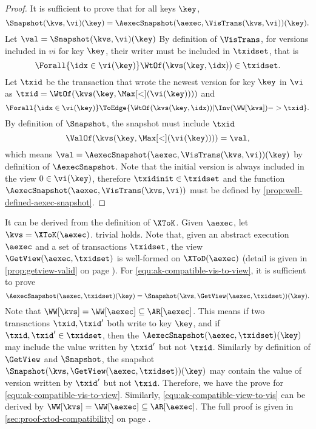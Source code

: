 \begin{proof}
    It is sufficient to prove that for all keys \( \key \),
    \[
        \Snapshot(\kvs,\vi)(\key) = \AexecSnapshot(\aexec,\VisTrans(\kvs,\vi))(\key) .
    \]
    Let \( \val = \Snapshot(\kvs,\vi)(\key) \)
    By definition of \( \VisTrans \), for versions included in \( vi \) for key \( \key \),
    their writer must be included in \( \txidset \), that is
    \[
        \Forall{\idx \in \vi(\key)} \WtOf(\kvs(\key,\idx)) \in \txidset .
    \]
    Let \( \txid \) be the transaction that wrote the newest version for key \( \key \) in \( \vi \)
    as \( \txid = \WtOf(\kvs(\key,\Max[<](\vi(\key)))) \) and 
    \[
        \Forall{\idx \in \vi(\key)} \ToEdge{ \WtOf(\kvs(\key,\idx)) | \Inv(\WW[\kvs]) -> \txid }.
    \]
    By definition of \( \Snapshot \), the snapshot must include \(\txid \)
    \[
        \ValOf(\kvs(\key,\Max[<](\vi(\key)))) = \val ,
    \]
    which means \( \val = \AexecSnapshot(\aexec,\VisTrans(\kvs,\vi))(\key) \) 
    by definition of \( \AexecSnapshot \).
    Note that the initial version is always included in the view \( 0 \in \vi(\key) \), 
    therefore \( \txidinit \in \txidset \) and the function 
    \( \AexecSnapshot(\aexec,\VisTrans(\kvs,\vi)) \)
    must be defined by \cref{prop:well-defined-aexec-snapshot}.
\end{proof}
\begin{proofsketch}
It can be derived from the definition of \( \XToK \).
Given \( \aexec \), let \( \kvs = \XToK(\aexec)\).
 trivial holds.
Note that, given an abstract execution \( \aexec \)
and a set of transactions \( \txidset \), the view \( \GetView(\aexec, \txidset) \) is well-formed on \( \XToD(\aexec) \)
(detail is given in \cref{prop:getview-valid} on page \pageref{sec:proof-well-formed-get-view}).
For \cref{equ:ak-compatible-vis-to-view}, it is sufficient to prove
\[
    \AexecSnapshot(\aexec,\txidset)(\key) = \Snapshot(\kvs,\GetView(\aexec,\txidset))(\key) .
\]
Note that \( \WW[\kvs] = \WW[\aexec] \subseteq \AR[\aexec] \).
This means if two transactions \( \txid, \txid' \) both write to key \( \key \),
and if \( \txid, \txid' \in \txidset \), then the \( \AexecSnapshot(\aexec,\txidset)(\key) \) may include the value written by \( \txid' \) but not \( \txid \).
Similarly by definition of \( \GetView \) and \( \Snapshot \),
the snapshot \( \Snapshot(\kvs,\GetView(\aexec,\txidset))(\key) \) may contain the value of version written by \( \txid' \) but not \( \txid \).
Therefore, we have the prove for \cref{equ:ak-compatible-vis-to-view}.
Similarly,  \cref{equ:ak-compatible-view-to-vis} can be derived by  \( \WW[\kvs] = \WW[\aexec] \subseteq \AR[\aexec] \).
The full proof is given in \cref{sec:proof-xtod-compatibility} on page \pageref{sec:proof-xtod-compatibility}.
\end{proofsketch}

